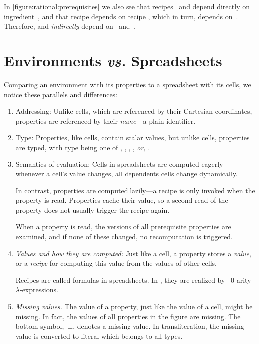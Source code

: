 In \cref{figure:rational:prerequisites} we also see that recipes~ and
 depend directly on ingredient~, and that recipe 
depends on recipe , which in turn, depends on~. Therefore,
 and  \emph{indirectly} depend on~ and~.

\section{Environments \emph{vs.} Spreadsheets}
Comparing an environment with its properties to a spreadsheet with its cells,
we notice these parallels and differences:

\begin{enumerate}
  \item{Addressing:} Unlike cells, which are referenced by their Cartesian coordinates,
  properties are referenced by their \emph{name}---a plain identifier.

  \item{Type:} Properties, like cells, contain scalar values, but unlike cells,
  properties are typed, with type being one of , ,
  , , \emph{or,} .

  \item{Semantics of evaluation:} Cells in spreadsheets are computed
  eagerly---whenever a cell's value changes, all dependents cells change
  dynamically.

  In contrast, properties are computed lazily---a recipe is only invoked
  when the property is read. Properties cache their value, so a second read
  of the property does not usually trigger the recipe again.

  When a property is read, the versions of all prerequisite
  properties are examined, and if none of these changed, no recomputation is
  triggered.

  \item\emph{Values and how they are computed:} Just like a cell, a property
  stores a \emph{value}, or a \emph{recipe} for computing this value from the
  values of other cells.

  Recipes are called formulas in spreadsheets. In \Reap, they are realized
  by \Java~$0$-arity~$λ$-expressions.

  \item\emph{Missing values.} The value of a property, just like the value
  of a cell, might be missing. In fact, the values of all properties in the
  figure are missing. The bottom symbol,~$⊥$, denotes a missing value. In
  transliteration, the missing value is converted to literal  which
  belongs to all types.

\end{enumerate}

